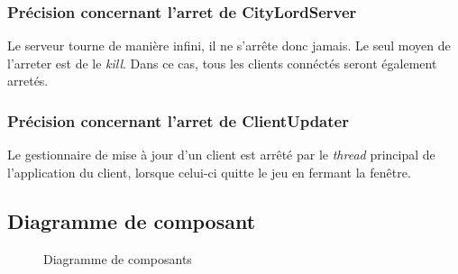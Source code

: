 \documentclass[a4paper,11pt]{report}
\begin{document}
\subsubsection{Précision concernant l'arret de CityLordServer}
Le serveur tourne de manière infini, il ne s'arrête donc jamais. Le seul moyen de l'arreter est de le \textit{kill}. Dans ce cas, tous les clients connéctés
seront également arretés.
\subsubsection{Précision concernant l'arret de ClientUpdater}
Le gestionnaire de mise à jour d'un client est arrêté par le \textit{thread} principal de l'application du client, lorsque celui-ci quitte le jeu en fermant la fenêtre.
\subsection{Diagramme de composant}
\begin{figure}[ht]
    \caption{Diagramme de composants}
\end{figure}

\newpage

\printindex
\end{document}

